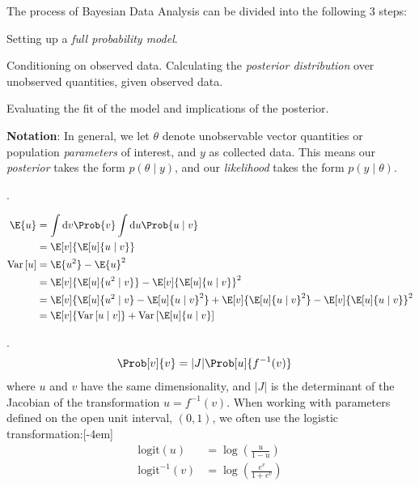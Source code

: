 \documentclass[11pt]{article}
\newcommand\myspace[1][]{\vspace{#1\bigskipamount}}
\newcommand\p{\Needspace{10\baselineskip} \noindent}
\newcommand\Var[1]{\mathrm{Var}\left[#1\right]}
\begin{document}

\p The process of Bayesian Data Analysis can be divided into the following 3 steps:
\begin{compactenum}
	\item Setting up a \textit{full probability model}.
	\item Conditioning on observed data. Calculating the \textit{posterior distribution} over unobserved quantities, given observed data.
	\item Evaluating the fit of the model and implications of the posterior. 
\end{compactenum}
\textbf{Notation}: In general, we let $\theta$ denote unobservable vector quantities or population \textit{parameters} of interest, and $y$ as collected data. This means our \textit{posterior} takes the form $p(\theta \mid y)$, and our \textit{likelihood} takes the form $p(y \mid \theta)$. 

\myspace
\p {}.
\graybox{
		\E{u} &= \E[v]{\E[u]{u \mid v}} \\
		\Var{u} &= \E[v]{ \Var{u \mid v} } + \Var{ \E[u]{u \mid v} }
}
\begin{example}[Proofs]
\vspace{-1em}
\begin{align}
	\E{u} 
		&= \int \mathrm{d}v \Prob{v} \int \mathrm{d}u \Prob{u \mid v} \\
		&= \E[v]{\E[u]{u \mid v}} \\
	\Var{u}
		&= \E{u^2} - \E{u}^2 \\
		&= \E[v]{ \E[u]{u^2 \mid v} } - \E[v]{\E[u]{u \mid v}}^2 \\
		&= \E[v]{ \E[u]{u^2 \mid v} - \E[u]{u \mid v}^2 } + \E[v]{\E[u]{u \mid v}^2} - \E[v]{\E[u]{u \mid v}}^2 \\
		&= \E[v]{ \Var{u \mid v} } + \Var{ \E[u]{u \mid v} }
\end{align}
\end{example}

\myspace
\p {}. 
\begin{align}
	\Prob[v]{v} &= |J| \Prob[u]{f^{-1}(v)}
\end{align}
where $u$ and $v$ have the same dimensionality, and $|J|$ is the determinant of the Jacobian of the transformation $u = f^{-1}(v)$. When working with parameters defined on the open unit interval, $(0, 1)$, we often use the logistic transformation:[-4em]
\begin{align}
	\text{logit}(u) &= \log\left(  \frac{u}{1 - u} \right) \\
	\text{logit}^{-1}(v) &= \log\left(  \frac{e^v}{1 + e^{v} } \right) 
\end{align}
\end{document}
